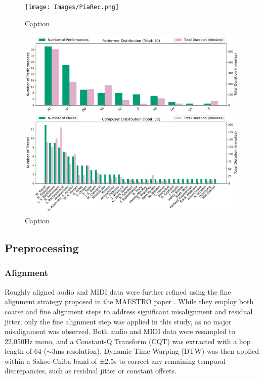 \documentclass{article}
\begin{document}
\begin{figure}
    \centering
    \texttt{[image: Images/PiaRec.png]}\hspace*{0cm}
    \caption{Caption}
    \label{fig:piarec}
\end{figure}


\begin{figure}
    \centering
    \includegraphics[width=\linewidth]{Images/performer_composer_distribution.pdf}\hspace*{0cm}
    \caption{Caption}
    \label{fig:performer_composer_distribution}
\end{figure}

\subsection{Preprocessing}
\subsubsection{Alignment}
Roughly aligned audio and MIDI data were further refined using the fine alignment strategy proposed in the MAESTRO paper \cite{hawthorne2019enablingfactorizedpianomusic}. While they employ both coarse and fine alignment steps to address significant misalignment and residual jitter, only the fine alignment step was applied in this study, as no major misalignment was observed. Both audio and MIDI data were resampled to 22,050\si{Hz} mono, and a Constant-Q Transform (CQT) was extracted with a hop length of 64 ($\sim$3\si{ms} resolution). Dynamic Time Warping (DTW) was then applied within a Sakoe-Chiba band of ±2.5\si{s} to correct any remaining temporal discrepancies, such as residual jitter or constant offsets.
\end{document}
